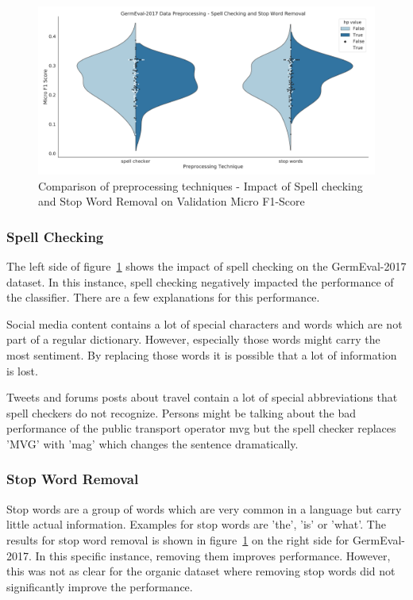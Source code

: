 \begin{figure}
	\centering
	\includegraphics[width=\textwidth]{figures/06_results/06_hp_ge_vio_data}
	\caption{Comparison of preprocessing techniques - Impact of Spell checking and Stop Word Removal on Validation Micro F1-Score}
	\label{fig:06_PreprocessingHp}
\end{figure}

\subsubsection{Spell Checking}

The left side of figure~\ref{fig:06_PreprocessingHp} shows the impact of spell checking on the GermEval-2017 dataset. In this instance, spell checking negatively impacted the performance of the classifier. There are a few explanations for this performance.
\medskip

Social media content contains a lot of special characters and words which are not part of a regular dictionary. However, especially those words might carry the most sentiment. By replacing those words it is possible that a lot of information is lost.
\medskip

Tweets and forums posts about travel contain a lot of special abbreviations that spell checkers do not recognize. Persons might be talking about the bad performance of the public transport operator \gls{mvg} but the spell checker replaces 'MVG' with 'mag' which changes the sentence dramatically.

\subsubsection{Stop Word Removal}

Stop words are a group of words which are very common in a language but carry little actual information. Examples for stop words are 'the', 'is' or 'what'. The results for stop word removal is shown in figure~\ref{fig:06_PreprocessingHp} on the right side for GermEval-2017. In this specific instance, removing them improves performance. However, this was not as clear for the organic dataset where removing stop words did not significantly improve the performance.

